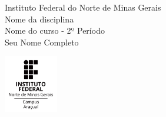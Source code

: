 \usetikzlibrary{positioning}
\pagestyle{plain}
\begin{flushleft}
Instituto Federal do Norte de Minas Gerais \hfill \\ %
Nome da disciplina\\ %
Nome do curso - 2º Período \\ %
Seu Nome Completo %
\end{flushleft}

\begin{flushright}\vspace{-5mm}
\includegraphics[height=2.5cm]{config/logo_black.jpg} %
\end{flushright}